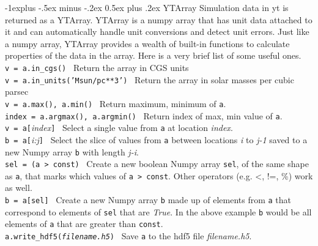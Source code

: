 \documentclass[10pt,landscape]{article}
\makeatletter
\renewcommand{\subsection}{\@startsection{subsection}{2}{0mm}%
                                {-1explus -.5ex minus -.2ex}%
                                {0.5ex plus .2ex}%
                                {\normalfont\normalsize\bfseries}}
\makeatother
\begin{document}
\begin{multicols}{3}
\subsection{YTArray}
Simulation data in yt is returned as a YTArray.  YTArray is a numpy array that
has unit data attached to it and can automatically handle unit conversions and
detect unit errors. Just like a numpy array, YTArray provides a wealth of
built-in functions to calculate properties of the data in the array. Here is a
very brief list of some useful ones.
\\
\texttt{v = a.in\_cgs()} \textemdash\ Return the array in CGS units \\
\texttt{v = a.in\_units('Msun/pc**3')} \textemdash\ Return the array in solar masses per cubic parsec \\ 
\texttt{v = a.max(), a.min()} \textemdash\ Return maximum, minimum of \texttt{a}. \\
\texttt{index = a.argmax(), a.argmin()} \textemdash\ Return index of max,
min value of \texttt{a}.\\
\texttt{v = a[}{\it index}\texttt{]} \textemdash\ Select a single value from \texttt{a} at location {\it index}.\\
\texttt{b = a[}{\it i:j}\texttt{]} \textemdash\ Select the slice of values from
\texttt{a} between
locations {\it i} to {\it j-1} saved to a new Numpy array \texttt{b} with length {\it j-i}. \\
\texttt{sel = (a > const)} \textemdash\ Create a new boolean Numpy array
\texttt{sel}, of the same shape as \texttt{a},
that marks which values of \texttt{a > const}. Other operators (e.g. \textless, !=, \%) work as well.\\
\texttt{b = a[sel]} \textemdash\ Create a new Numpy array \texttt{b} made up of
elements from \texttt{a} that correspond to elements of \texttt{sel}
that are {\it True}. In the above example \texttt{b} would be all elements of \texttt{a} that are greater than \texttt{const}.\\
\texttt{a.write\_hdf5({\it filename.h5})} \textemdash\ Save \texttt{a} to the hdf5 file {\it filename.h5}.\\


\end{multicols}
\end{document}
